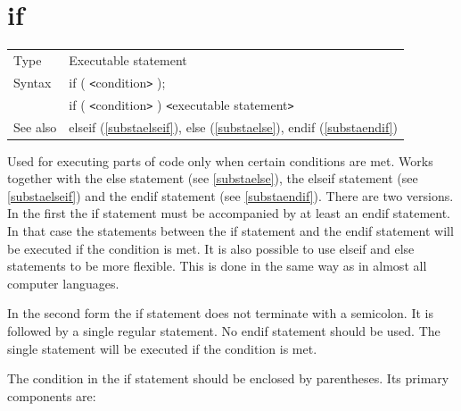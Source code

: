  
\section{if}
\label{substaif}

\noindent \begin{tabular}{ll}
Type & Executable statement\\
Syntax & if ( {\tt<}condition{\tt>} ); \\
       & if ( {\tt<}condition{\tt>} ) {\tt<}executable statement{\tt>}
\\ See also & elseif (\ref{substaelseif}),
              else (\ref{substaelse}),
              endif (\ref{substaendif})
\end{tabular} \vspace{4mm}

\noindent Used for executing parts of code only when certain 
conditions are met. Works together with the 
else statement (see \ref{substaelse}), the elseif 
statement (see \ref{substaelseif}) and the endif statement 
(see \ref{substaendif}). There are two versions. In the first the if 
statement must be accompanied by at least an endif statement. In that case 
the statements between the if statement and the endif statement will be 
executed if the condition is met. It is also possible to use elseif and 
else statements to be more flexible. This is done in the same way as in 
almost all computer languages.

\noindent In the second form the if statement does not terminate with a 
semicolon. It is followed by a single regular statement. 
No endif statement should be used. The single statement will be executed if 
the condition is met.

\noindent The condition in the if statement should be enclosed by 
parentheses. Its primary components are:

